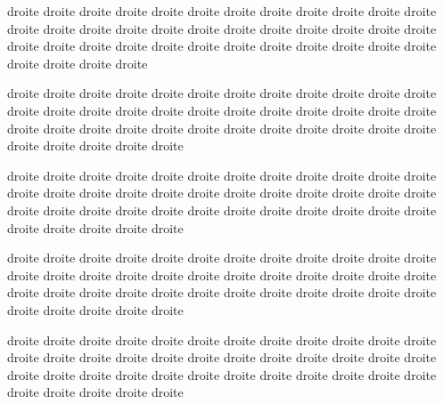 \documentclass[12pt]{book}
\begin{document}
\begin{pages}
\begin{Rightside}
\pend

\endnumbering
\end{Rightside}
\begin{Leftside}
\beginnumbering
\pstart
\begin{ledgroup}
droite droite droite droite droite droite droite droite droite droite droite droite droite droite droite droite droite droite droite droite droite droite droite droite droite droite droite droite droite droite droite droite droite droite droite droite droite droite droite droite 
\end{ledgroup}
\pend

\pstart
\begin{ledgroup}
droite droite droite droite droite droite droite droite droite droite droite droite droite droite droite droite droite droite droite droite droite droite droite droite droite droite droite droite droite droite droite droite droite droite droite droite droite droite droite droite droite 
\end{ledgroup}
\pend

\pstart
\begin{ledgroup}
droite droite droite droite droite droite droite droite droite droite droite droite droite droite droite droite droite droite droite droite droite droite droite droite droite droite droite droite droite droite droite droite droite droite droite droite droite droite droite droite droite 
\end{ledgroup}
\pend

\pstart
\begin{ledgroup}
droite droite droite droite droite droite droite droite droite droite droite droite droite droite droite droite droite droite droite droite droite droite droite droite droite droite droite droite droite droite droite droite droite droite droite droite droite droite droite droite droite 
\end{ledgroup}
\pend

\pstart
\begin{ledgroup}
droite droite droite droite droite droite droite droite droite droite droite droite droite droite droite droite droite droite droite droite droite droite droite droite droite droite droite droite droite droite droite droite droite droite droite droite droite droite droite droite droite 
\end{ledgroup}
\pend
\endnumbering
\end{Leftside}

\end{pages}
\Pages
\end{document}
